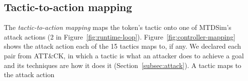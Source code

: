 \documentclass{cshonours}
\begin{document}
\subsection{Tactic-to-action mapping}
\label{subsec:tactic-verb-mapping}

The \emph{tactic-to-action mapping} maps the token's tactic onto one of
MTDSim's attack actions (2 in Figure~\ref{fig:runtime-loop}).
Figure~\ref{fig:controller-mapping} shows the attack action each of the 15
tactics maps to, if any. We declared each pair from ATT\&CK, in which a
tactic is what an attacker does to achieve a goal and its techniques are how
it does it (Section~\ref{subsec:attack}). A tactic maps to the attack action
\end{document}

